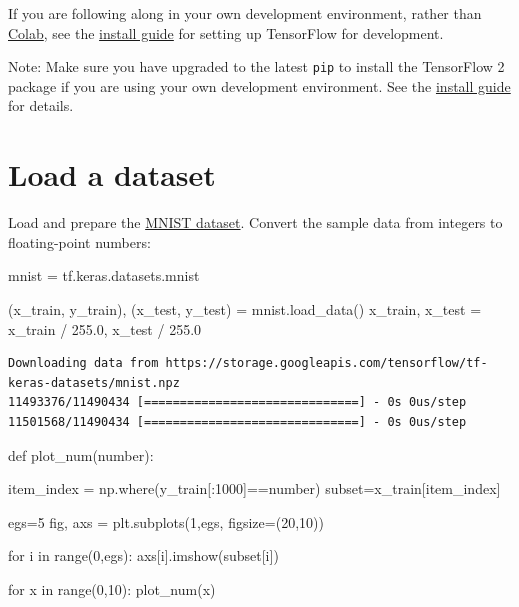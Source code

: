 \documentclass[
  letterpaper,
  DIV=11,
  numbers=noendperiod]{scrreprt}
\newenvironment{Shaded}{\begin{snugshade}}{\end{snugshade}}
\newcommand{\BuiltInTok}[1]{\textcolor[rgb]{0.00,0.23,0.31}{#1}}
\newcommand{\ControlFlowTok}[1]{\textcolor[rgb]{0.00,0.23,0.31}{#1}}
\newcommand{\DecValTok}[1]{\textcolor[rgb]{0.68,0.00,0.00}{#1}}
\newcommand{\FloatTok}[1]{\textcolor[rgb]{0.68,0.00,0.00}{#1}}
\newcommand{\KeywordTok}[1]{\textcolor[rgb]{0.00,0.23,0.31}{#1}}
\newcommand{\NormalTok}[1]{\textcolor[rgb]{0.00,0.23,0.31}{#1}}
\newcommand{\OperatorTok}[1]{\textcolor[rgb]{0.37,0.37,0.37}{#1}}
\begin{document}
If you are following along in your own development environment, rather
than
\href{https://colab.research.google.com/github/tensorflow/docs/blob/master/site/en/tutorials/quickstart/beginner.ipynb}{Colab},
see the \href{https://www.tensorflow.org/install}{install guide} for
setting up TensorFlow for development.

Note: Make sure you have upgraded to the latest \texttt{pip} to install
the TensorFlow 2 package if you are using your own development
environment. See the \href{https://www.tensorflow.org/install}{install
guide} for details.

\hypertarget{load-a-dataset}{%
\section{Load a dataset}\label{load-a-dataset}}

Load and prepare the \href{http://yann.lecun.com/exdb/mnist/}{MNIST
dataset}. Convert the sample data from integers to floating-point
numbers:

\begin{Shaded}
\begin{Highlighting}[]
\NormalTok{mnist }\OperatorTok{=}\NormalTok{ tf.keras.datasets.mnist}

\NormalTok{(x\_train, y\_train), (x\_test, y\_test) }\OperatorTok{=}\NormalTok{ mnist.load\_data()}
\NormalTok{x\_train, x\_test }\OperatorTok{=}\NormalTok{ x\_train }\OperatorTok{/} \FloatTok{255.0}\NormalTok{, x\_test }\OperatorTok{/} \FloatTok{255.0}
\end{Highlighting}
\end{Shaded}

\begin{verbatim}
Downloading data from https://storage.googleapis.com/tensorflow/tf-keras-datasets/mnist.npz
11493376/11490434 [==============================] - 0s 0us/step
11501568/11490434 [==============================] - 0s 0us/step
\end{verbatim}

\begin{Shaded}
\begin{Highlighting}[]

\KeywordTok{def}\NormalTok{ plot\_num(number):}

\NormalTok{  item\_index }\OperatorTok{=}\NormalTok{ np.where(y\_train[:}\DecValTok{1000}\NormalTok{]}\OperatorTok{==}\NormalTok{number)}
\NormalTok{  subset}\OperatorTok{=}\NormalTok{x\_train[item\_index]}
  
\NormalTok{  egs}\OperatorTok{=}\DecValTok{5}
\NormalTok{  fig, axs }\OperatorTok{=}\NormalTok{ plt.subplots(}\DecValTok{1}\NormalTok{,egs, figsize}\OperatorTok{=}\NormalTok{(}\DecValTok{20}\NormalTok{,}\DecValTok{10}\NormalTok{))}

  \ControlFlowTok{for}\NormalTok{ i }\KeywordTok{in} \BuiltInTok{range}\NormalTok{(}\DecValTok{0}\NormalTok{,egs):}
\NormalTok{    axs[i].imshow(subset[i])}


\ControlFlowTok{for}\NormalTok{ x }\KeywordTok{in} \BuiltInTok{range}\NormalTok{(}\DecValTok{0}\NormalTok{,}\DecValTok{10}\NormalTok{):}
\NormalTok{  plot\_num(x)}
\end{Highlighting}
\end{Shaded}
\end{document}
